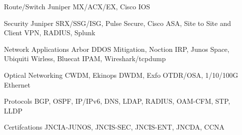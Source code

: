 


\begin{cvskills}


\cvskill
{Route/Switch}
{Juniper MX/ACX/EX, Cisco IOS}


\cvskill
{Security}
{Juniper SRX/SSG/ISG, Pulse Secure, Cisco ASA, Site to Site and Client VPN, RADIUS, Splunk}


\cvskill
{Network Applications}
{Arbor DDOS Mitigation, Noction IRP, Junos Space, Ubiquiti Wirless, Bluecat IPAM, Wireshark/tcpdump}


\cvskill
{Optical Networking}
{CWDM, Ekinops DWDM, Exfo OTDR/OSA, 1/10/100G Ethernet}


\cvskill
{Protocols}
{BGP, OSPF, IP/IPv6, DNS, LDAP, RADIUS, OAM-CFM, STP, LLDP}


\cvskill
{Certifcations}
{JNCIA-JUNOS, JNCIS-SEC, JNCIS-ENT, JNCDA, CCNA}

\end{cvskills}
